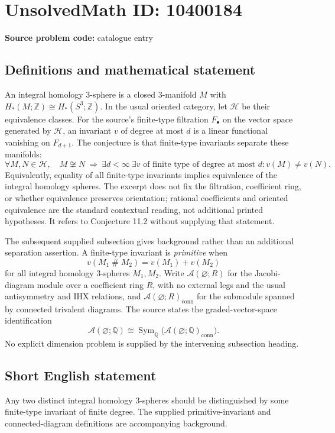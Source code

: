 \documentclass[11pt]{article}
\newcommand{\Z}{\mathbb{Z}}
\newcommand{\Q}{\mathbb{Q}}
\begin{document}
\section*{UnsolvedMath ID: 10400184}
\textbf{Source problem code:} catalogue entry
\subsection{Definitions and mathematical statement}
An integral homology \(3\)-sphere is a closed \(3\)-manifold \(M\) with \(H_*(M;\Z)\cong H_*(S^3;\Z)\). In the usual oriented category, let \(\mathcal H\) be their equivalence classes. For the source's finite-type filtration \(F_\bullet\) on the vector space generated by \(\mathcal H\), an invariant \(v\) of degree at most \(d\) is a linear functional vanishing on \(F_{d+1}\). The conjecture is that finite-type invariants separate these manifolds:
\[
 \forall M,N\in\mathcal H,\quad
 M\not\cong N\ \Longrightarrow\
 \exists d<\infty\ \exists v\text{ of finite type of degree at most }d:
 v(M)\ne v(N).
\]
Equivalently, equality of all finite-type invariants implies equivalence of the integral homology spheres. The excerpt does not fix the filtration, coefficient ring, or whether equivalence preserves orientation; rational coefficients and oriented equivalence are the standard contextual reading, not additional printed hypotheses. It refers to Conjecture 11.2 without supplying that statement.

The subsequent supplied subsection gives background rather than an additional separation assertion. A finite-type invariant is \emph{primitive} when
\[
 v(M_1\mathbin{\#}M_2)=v(M_1)+v(M_2)
\]
for all integral homology \(3\)-spheres \(M_1,M_2\). Write \(\mathcal A(\varnothing;R)\) for the Jacobi-diagram module over a coefficient ring \(R\), with no external legs and the usual antisymmetry and IHX relations, and \(\mathcal A(\varnothing;R)_{\mathrm{conn}}\) for the submodule spanned by connected trivalent diagrams. The source states the graded-vector-space identification
\[
 \mathcal A(\varnothing;\Q)
 \cong \operatorname{Sym}_{\Q}
       \bigl(\mathcal A(\varnothing;\Q)_{\mathrm{conn}}\bigr).
\]
No explicit dimension problem is supplied by the intervening subsection heading.
\subsection{Short English statement}
Any two distinct integral homology \(3\)-spheres should be distinguished by some finite-type invariant of finite degree. The supplied primitive-invariant and connected-diagram definitions are accompanying background.
\end{document}
